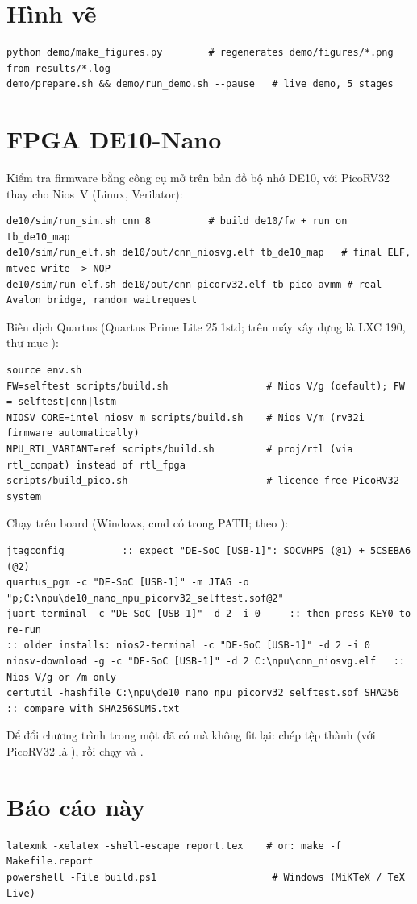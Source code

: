 \section{Hình vẽ}
\begin{lstlisting}[style=codebash]
python demo/make_figures.py        # regenerates demo/figures/*.png from results/*.log
demo/prepare.sh && demo/run_demo.sh --pause   # live demo, 5 stages
\end{lstlisting}

\section{FPGA DE10-Nano}
Kiểm tra firmware bằng công cụ mở trên bản đồ bộ nhớ DE10, với PicoRV32 thay cho Nios~V (Linux, Verilator):
\begin{lstlisting}[style=codebash]
de10/sim/run_sim.sh cnn 8          # build de10/fw + run on tb_de10_map
de10/sim/run_elf.sh de10/out/cnn_niosvg.elf tb_de10_map   # final ELF, mtvec write -> NOP
de10/sim/run_elf.sh de10/out/cnn_picorv32.elf tb_pico_avmm # real Avalon bridge, random waitrequest
\end{lstlisting}
Biên dịch Quartus (Quartus Prime Lite 25.1std; trên máy xây dựng là LXC 190, thư mục ):
\begin{lstlisting}[style=codebash]
source env.sh
FW=selftest scripts/build.sh                 # Nios V/g (default); FW = selftest|cnn|lstm
NIOSV_CORE=intel_niosv_m scripts/build.sh    # Nios V/m (rv32i firmware automatically)
NPU_RTL_VARIANT=ref scripts/build.sh         # proj/rtl (via rtl_compat) instead of rtl_fpga
scripts/build_pico.sh                        # licence-free PicoRV32 system
\end{lstlisting}
Chạy trên board (Windows, cmd có  trong PATH; theo ):
\begin{lstlisting}[style=codebash]
jtagconfig          :: expect "DE-SoC [USB-1]": SOCVHPS (@1) + 5CSEBA6 (@2)
quartus_pgm -c "DE-SoC [USB-1]" -m JTAG -o "p;C:\npu\de10_nano_npu_picorv32_selftest.sof@2"
juart-terminal -c "DE-SoC [USB-1]" -d 2 -i 0     :: then press KEY0 to re-run
:: older installs: nios2-terminal -c "DE-SoC [USB-1]" -d 2 -i 0
niosv-download -g -c "DE-SoC [USB-1]" -d 2 C:\npu\cnn_niosvg.elf   :: Nios V/g or /m only
certutil -hashfile C:\npu\de10_nano_npu_picorv32_selftest.sof SHA256  :: compare with SHA256SUMS.txt
\end{lstlisting}
Để đổi chương trình trong một  đã có mà không fit lại: chép tệp  thành  (với PicoRV32 là ), rồi chạy  và .

\section{Báo cáo này}
\begin{lstlisting}[style=codebash]
latexmk -xelatex -shell-escape report.tex    # or: make -f Makefile.report
powershell -File build.ps1                    # Windows (MiKTeX / TeX Live)
\end{lstlisting}
